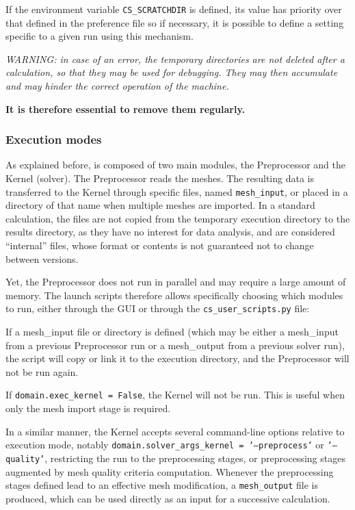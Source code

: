 {{{If the environment variable \texttt{CS\_SCRATCHDIR} is defined,
its value has priority over that defined in the preference file
so if necessary, it
is possible to define a setting specific to a given run using this mechanism.

\noindent
{\em WARNING: in case of an error, the temporary directories are not deleted
after a calculation, so that they may be used for debugging. They may then
accumulate and may hinder the correct operation of the machine.\\
\centerline{\bf It is therefore essential to remove them regularly.}}


\subsubsection{Execution modes}
\label{sec:prg_executionmodes}%
As explained before, \CS is composed of two main modules, the Preprocessor and the
Kernel (solver). The Preprocessor reads the meshes.
The resulting data is transferred to the Kernel through specific
files, named \texttt{mesh\_input}, or placed in a directory of that name when multiple meshes are imported. In a standard calculation, the files
are not copied from the temporary execution directory to the results directory,
as they have no interest for data analysis, and are considered ``internal''
files, whose format or contents is not guaranteed not to change between \CS versions.

Yet, the Preprocessor does not run in parallel and may require a
large amount of memory. The launch scripts therefore allows specifically
choosing which modules to run, either through the GUI or through the
\texttt{cs\_user\_scripts.py} file:

\hspace*{0.5cm} If a {mesh\_input} file or directory is defined (which may be
either a {mesh\_input} from a previous Preprocessor run or a {mesh\_output}
from a previous solver run), the script will copy or link it to
the execution directory, and the Preprocessor will not be run again.

\hspace*{0.5cm} If \texttt{domain.exec\_kernel = False}, the Kernel will not
be run. This is useful when only the mesh import stage is required.

In a similar manner, the Kernel accepts several command-line options relative to execution mode, notably \texttt{domain.solver\_args\_kernel = '--preprocess'} or \texttt{'--quality'}, restricting the run to the preprocessing stages, or preprocessing stages augmented by mesh quality criteria computation. Whenever the preprocessing stages defined lead to an effective mesh modification, a \texttt{mesh\_output} file is produced, which can be used directly as an input for a successive calculation.

}}}
